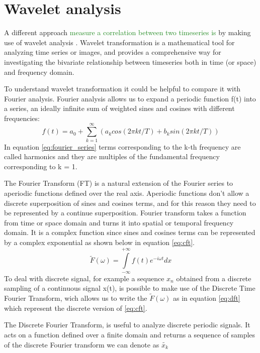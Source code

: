 \documentclass[11pt]{report}
\begin{document}
\section{Wavelet analysis}
A different approach \textcolor{ForestGreen}{measure a correlation between two timeseries is} by making use of wavelet analysis \cite{ferrante-2015} \cite{vandenberg-1999}.
Wavelet transformation is a mathematical tool for analyzing time series or images, and provides a comprehensive way for investigating the bivariate relationship between timeseries both in time (or space) and frequency domain.

To understand wavelet transformation it could be helpful to compare it with Fourier analysis.
Fourier analysis allows us to expand a periodic function f(t) into a series, an ideally infinite sum of weighted sines and cosines with different frequencies:
\begin{equation}\label{eq:fourier_series}
f(t) = a_0 + \sum_{k = 1}^\infty (a_k cos(2\pi k t/T) + b_k sin (2\pi k t /T))
\end{equation}
In equation \ref{eq:fourier_series} terms corresponding to the k-th frequency are called harmonics and they are multiples of the fundamental frequency corresponding to k = 1.

The Fourier Transform (FT) is a natural extension of the Fourier series to aperiodic functions defined over the real axis.
Aperiodic functions don't allow a discrete superposition of sines and cosines terms, and for this reason they need to be represented by a continue superposition.
Fourier transform takes a function from time or space domain and turns it into spatial or temporal frequency domain.
It is a complex function since sines and cosines terms can be represented by a complex exponential as shown below in equation \ref{eq:cft}.
\begin{equation}\label{eq:cft}
\tilde{F}(\omega) = \int\limits_{-\infty}^{+\infty} f(t)e^{-i \omega t} dx
\end{equation}
To deal with discrete signal, for example a sequence $x_n$ obtained from a discrete sampling of a continuous signal x(t), is possible to make use of the Discrete Time Fourier Transform, wich allows us to write the $\tilde F(\omega)$ as in equation \ref{eq:dft} which represent the discrete version of \ref{eq:cft}.

The Discrete Fourier Transform, is useful to analyze discrete periodic signals.
It acts on a function defined over a finite domain and returns a sequence of samples of the discrete Fourier transform we can denote as $\tilde{x_k}$
\end{document}
